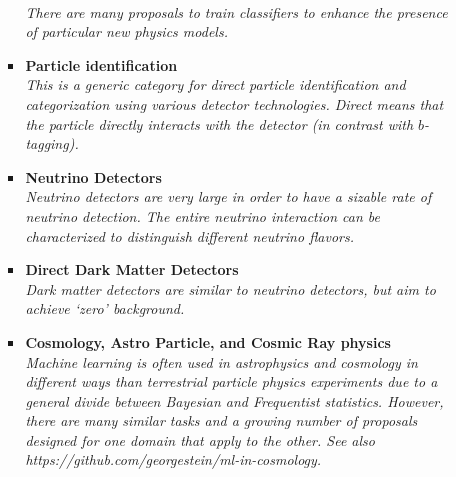 \documentclass[12pt,letterpaper]{article}
\begin{document}
\begin{itemize}
\begin{itemize}
\begin{itemize}
			\\\textit{There are many proposals to train classifiers to enhance the presence of particular new physics models.}
			\item \textbf{Particle identification}~\cite{deOliveira:2018lqd,Paganini:DLPS2017,Hooberman:DLPS2017,Belayneh:2019vyx,Qasim:2019otl,Collado:2020fwm,Verma:2021ixg,Graziani:2021vai}
			\\\textit{This is a generic category for direct particle identification and categorization using various detector technologies.  Direct means that the particle directly interacts with the detector (in contrast with $b$-tagging).}
			\item \textbf{Neutrino Detectors}~\cite{Adams:2018bvi,Aurisano:2016jvx,Acciarri:2016ryt,Hertel:DLPS2017,Aiello:2020orq,Adams:2020vlj,Domine:2020tlx,1805474,1808859,Psihas:2020pby,alonsomonsalve2020graph,Abratenko:2020pbp,Clerbaux:2020ttg,Liu:2020pzv,Abratenko:2020ocq,Chen:2020zkj,Qian:2021vnh,abbasi2021convolutional,Drielsma:2021jdv,Rossi:2021tjf,Hewes:2021heg,Acciarri:2021oav,Belavin:2021bxb,Maksimovic:2021dmz,Gavrikov:2021ktt,Garcia-Mendez:2021vts,Carloni:2021zbc,MicroBooNE:2021nss}
			\\\textit{Neutrino detectors are very large in order to have a sizable rate of neutrino detection.  The entire neutrino interaction can be characterized to distinguish different neutrino flavors.}
			\item \textbf{Direct Dark Matter Detectors}~\cite{Ilyasov_2020,Akerib:2020aws,Khosa:2019qgp,Golovatiuk:2021lqn,McDonald:2021hus,Coarasa:2021fpv}
			\\\textit{Dark matter detectors are similar to neutrino detectors, but aim to achieve `zero' background.}
			\item \textbf{Cosmology, Astro Particle, and Cosmic Ray physics}~\cite{Ostdiek:2020cqz,Brehmer:2019jyt,Tsai:2020vcx,Verma:2020gnq,Aab:2021rcn,Balazs:2021uhg,gonzalez2021tackling,Conceicao:2021xgn,huang2021convolutionalneuralnetwork,Droz:2021wnh,Han:2021kjx,Arjona:2021hmg,1853992,Shih:2021kbt,Ikeda:2021sxm,Aizpuru:2021vhd,Vago:2021grx,List:2021aer,Kahlhoefer:2021sha,Sabiu:2021aea,Mishra-Sharma:2021nhh,Mishra-Sharma:2021oxe,Bister:2021arb}
			\\\textit{Machine learning is often used in astrophysics and cosmology in different ways than terrestrial particle physics experiments due to a general divide between Bayesian and Frequentist statistics.  However, there are many similar tasks and a growing number of proposals designed for one domain that apply to the other.  See also https://github.com/georgestein/ml-in-cosmology.}

\end{itemize}
\end{itemize}
\end{itemize}
\end{document}
